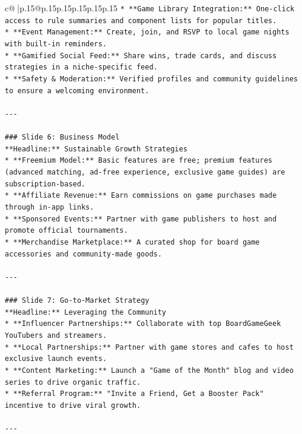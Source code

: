 \documentclass{article}
\begin{document}
{\begin{supertabular}{c@{$\;$}|p{.15\linewidth}@{}p{.15\linewidth}p{.15\linewidth}p{.15\linewidth}p{.15\linewidth}p{.15\linewidth}}
{{{\texttt{*   **Game Library Integration:** One{-}click access to rule summaries and component lists for popular titles.} \\
\texttt{*   **Event Management:** Create, join, and RSVP to local game nights with built{-}in reminders.} \\
\texttt{*   **Gamified Social Feed:** Share wins, trade cards, and discuss strategies in a niche{-}specific feed.} \\
\texttt{*   **Safety \& Moderation:** Verified profiles and community guidelines to ensure a welcoming environment.} \\
\\ 
\texttt{{-}{-}{-}} \\
\\ 
\texttt{\#\#\# Slide 6: Business Model} \\
\texttt{**Headline:** Sustainable Growth Strategies} \\
\texttt{*   **Freemium Model:** Basic features are free; premium features (advanced matching, ad{-}free experience, exclusive game guides) are subscription{-}based.} \\
\texttt{*   **Affiliate Revenue:** Earn commissions on game purchases made through in{-}app links.} \\
\texttt{*   **Sponsored Events:** Partner with game publishers to host and promote official tournaments.} \\
\texttt{*   **Merchandise Marketplace:** A curated shop for board game accessories and community{-}made goods.} \\
\\ 
\texttt{{-}{-}{-}} \\
\\ 
\texttt{\#\#\# Slide 7: Go{-}to{-}Market Strategy} \\
\texttt{**Headline:** Leveraging the Community} \\
\texttt{*   **Influencer Partnerships:** Collaborate with top BoardGameGeek YouTubers and streamers.} \\
\texttt{*   **Local Partnerships:** Partner with game stores and cafes to host exclusive launch events.} \\
\texttt{*   **Content Marketing:** Launch a "Game of the Month" blog and video series to drive organic traffic.} \\
\texttt{*   **Referral Program:** "Invite a Friend, Get a Booster Pack" incentive to drive viral growth.} \\
\\ 
\texttt{{-}{-}{-}} \\
}}}
\end{supertabular}}
\end{document}
